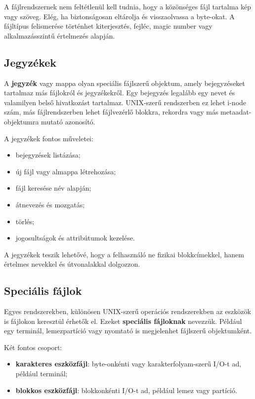 A fájlrendszernek nem feltétlenül kell tudnia, hogy a közönséges fájl tartalma kép vagy szöveg. Elég, ha biztonságosan eltárolja és visszaolvassa a byte-okat. A fájltípus felismerése történhet kiterjesztés, fejléc, magic number vagy alkalmazásszintű értelmezés alapján.

\subsection{Jegyzékek}

A \textbf{jegyzék} vagy mappa olyan speciális fájlszerű objektum, amely bejegyzéseket tartalmaz más fájlokról és jegyzékekről. Egy bejegyzés legalább egy nevet és valamilyen belső hivatkozást tartalmaz. UNIX-szerű rendszerben ez lehet i-node szám, más fájlrendszerben lehet fájlvezérlő blokkra, rekordra vagy más metaadat-objektumra mutató azonosító.

A jegyzékek fontos műveletei:

\begin{itemize}
  \item bejegyzések listázása;
  \item új fájl vagy almappa létrehozása;
  \item fájl keresése név alapján;
  \item átnevezés és mozgatás;
  \item törlés;
  \item jogosultságok és attribútumok kezelése.
\end{itemize}

A jegyzékek teszik lehetővé, hogy a felhasználó ne fizikai blokkcímekkel, hanem értelmes nevekkel és útvonalakkal dolgozzon.

\subsection{Speciális fájlok}

Egyes rendszerekben, különösen UNIX-szerű operációs rendszerekben az eszközök is fájlokon keresztül érhetők el. Ezeket \textbf{speciális fájloknak} nevezzük. Például egy terminál, lemezpartíció vagy nyomtató is megjelenhet fájlszerű objektumként.

Két fontos csoport:

\begin{itemize}
  \item \textbf{karakteres eszközfájl}: byte-onkénti vagy karakterfolyam-szerű I/O-t ad, például terminál;
  \item \textbf{blokkos eszközfájl}: blokkonkénti I/O-t ad, például lemez vagy partíció.
\end{itemize}

